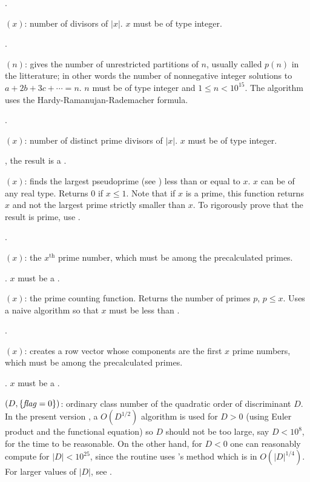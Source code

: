 .

$(x)$: number of divisors of $|x|$. $x$ must be of type
integer.

.

$(n)$: gives the number of unrestricted partitions of
$n$, usually called $p(n)$ in the litterature; in other words the number of
nonnegative integer solutions to $a+2b+3c+\cdots=n$. $n$ must be of type
integer and $1\le n<10^{15}$. The algorithm uses the
Hardy-Ramanujan-Rademacher formula.

.

$(x)$: number of distinct prime divisors of $|x|$. $x$
must be of type integer.

, the result is a .

$(x)$: finds the largest pseudoprime (see
) less than or equal to $x$. $x$ can be of any real type.
Returns 0 if $x\le1$. Note that if $x$ is a prime, this function returns $x$
and not the largest prime strictly smaller than $x$. To rigorously prove that
the result is prime, use .

.

$(x)$: the $x^{\text{th}}$ prime number, which must be among
the precalculated primes.

. $x$ must be a .

$(x)$: the prime counting function. Returns the number of
primes $p$, $p \leq x$. Uses a naive algorithm so that $x$ must be less than 
.

.

$(x)$: creates a row vector whose components
are the first $x$ prime numbers, which must be among the precalculated primes.

. $x$ must be a .

$(D,\{\hbox{\it f\kern0pt lag\/}=0\})$: ordinary class number of the quadratic
order of discriminant $D$. In the present version \vers, a $O(D^{1/2})$
algorithm is used for $D > 0$ (using Euler product and the functional
equation) so $D$ should not be too large, say $D < 10^8$, for the time to be
reasonable. On the other hand, for $D < 0$ one can reasonably compute
 for $|D|<10^{25}$, since the routine uses
's method which is in $O(|D|^{1/4})$. For larger values of $|D|$,
see .

